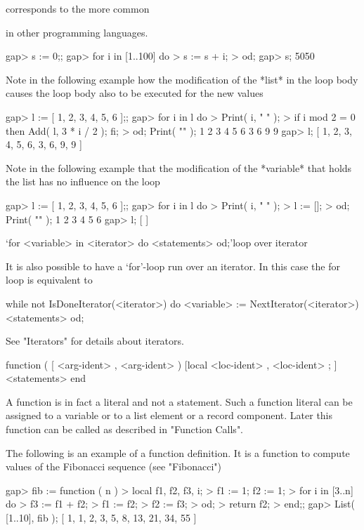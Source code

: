 corresponds to the more common


in other programming languages.

\beginexample
gap> s := 0;;
gap> for i in [1..100] do
>    s := s + i;
> od;
gap> s;
5050
\endexample

Note in the following example how the modification of the *list* in the
loop body causes the loop body also to be executed for the new values

\beginexample
gap> l := [ 1, 2, 3, 4, 5, 6 ];;
gap> for i in l do
>    Print( i, " " );
>    if i mod 2 = 0 then Add( l, 3 * i / 2 ); fi;
> od; Print( "\n" );
1 2 3 4 5 6 3 6 9 9
gap> l;
[ 1, 2, 3, 4, 5, 6, 3, 6, 9, 9 ]
\endexample

Note in the following example that the modification of the *variable*
that holds the list has no influence on the loop

\beginexample
gap> l := [ 1, 2, 3, 4, 5, 6 ];;
gap> for i in l do
>    Print( i, " " );
>    l := [];
> od; Print( "\n" );
1 2 3 4 5 6
gap> l;
[ ]
\endexample

\>`for <variable> in <iterator> do <statements> od;'{loop over iterator}

It is also possible to have a `for'-loop run over an iterator. In this case
the for loop is equivalent to

\begintt
while not IsDoneIterator(<iterator>) do
  <variable> := NextIterator(<iterator>)
  <statements>
od;
\endtt

See "Iterators" for details about iterators.


\begintt
function ( [ <arg-ident> {, <arg-ident>} )
[local  <loc-ident> {, <loc-ident>} ; ]
<statements>
end
\endtt

A function is in fact a literal and not a statement. Such a function
literal can be assigned to a variable or to a list element or a record
component. Later this function can be called as described in "Function
Calls".

The following is an example of a function definition.  It is a function
to compute values of the Fibonacci sequence (see "Fibonacci")

\beginexample
gap> fib := function ( n )
>     local f1, f2, f3, i;
>     f1 := 1; f2 := 1;
>     for i in [3..n] do
>       f3 := f1 + f2;
>       f1 := f2;
>       f2 := f3;
>     od;
>     return f2;
>   end;;
gap> List( [1..10], fib );
[ 1, 1, 2, 3, 5, 8, 13, 21, 34, 55 ]
\endexample

